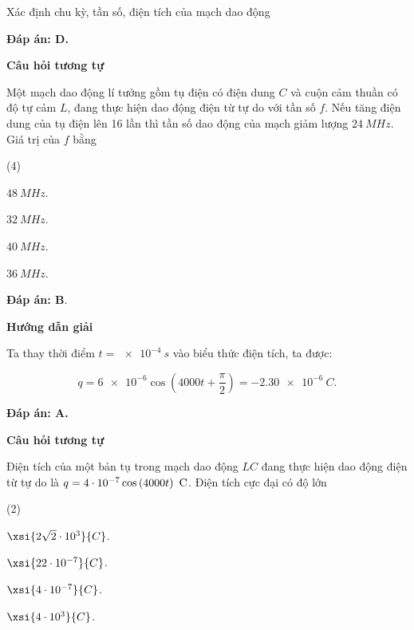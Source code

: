 \begin{dang}{Xác định chu kỳ, tần số, điện tích của mạch dao động}
{		\textbf{Đáp án: D.}
		
		\begin{center}
			\textbf{Câu hỏi tương tự}
		\end{center}
		
			Một mạch dao động lí tưởng gồm tụ điện có điện dung $C$ và cuộn cảm thuần có độ tự cảm $L$, đang thực hiện dao động điện từ tự do với tần số $f$. Nếu tăng điện dung của tụ điện lên 16 lần thì tần số dao động của mạch giảm lượng $\SI{24}{MHz}$. Giá trị của $f$ bằng
		\begin{mcq}(4)
			\item $\SI{48}{MHz}$. 
			\item $\SI{32}{MHz}$. 
			\item $\SI{40}{MHz}$. 
			\item $\SI{36}{MHz}$. 
		\end{mcq}
		
		\textbf{Đáp án: B}.
	}
	{	\begin{center}
			\textbf{Hướng dẫn giải}
		\end{center}
	
	Ta thay thời điểm $t = \SI{e-4}{s}$ vào biểu thức điện tích, ta được:
	
	$$ q = \num{6e-6} \cos \left( 4000t + \dfrac{\pi}{2} \right) = -\SI{2,30 e-6}{C}.$$
	
	\textbf{Đáp án: A.}
		
		\begin{center}
			\textbf{Câu hỏi tương tự}
		\end{center}
		
		Điện tích của một bản tụ trong mạch dao động $LC$ đang thực hiện dao động điện từ tự do là $q = 4\cdot10^{-7} \cos \left( 4000t \right)\ \text C$. Điện tích cực đại có độ lớn
		\begin{mcq}(2)
			\item $\xsi{2\sqrt{2}\cdot10^{3}}{C}$. 
			\item $\xsi{22\cdot10^{-7}}{C}$. 
			\item $\xsi{4\cdot10^{-7}}{C}$. 
			\item $\xsi{4\cdot10^{3}}{C}$. 
		\end{mcq}
		
}
\end{dang}
